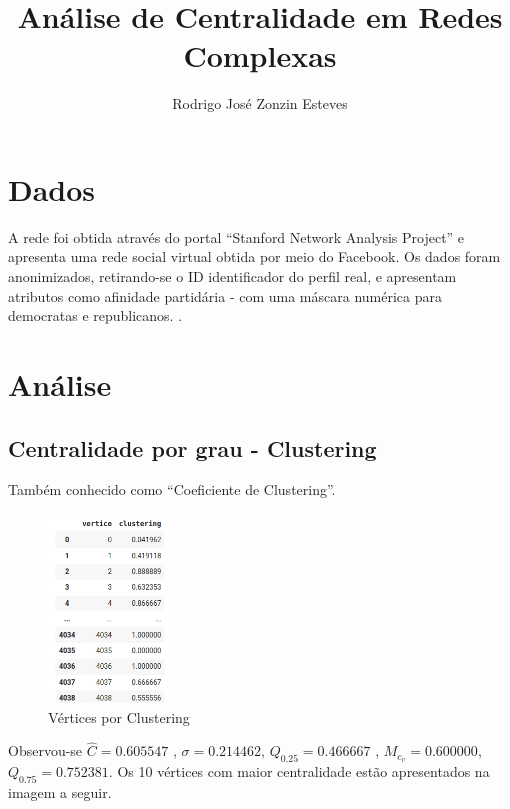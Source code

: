 \documentclass{article}
\title{Análise de Centralidade em Redes Complexas}
\author{Rodrigo José Zonzin Esteves\inst{1}}
\begin{document}
 

\maketitle
     

\section{Dados}
A rede foi obtida através do portal “Stanford Network Analysis Project” e apresenta uma rede social virtual obtida por meio do Facebook. Os dados foram anonimizados, retirando-se o ID identificador do perfil real, e apresentam atributos como afinidade partidária - com uma máscara numérica para democratas e republicanos. \cite{McAuley2012}.  

\section{Análise}
\subsection{Centralidade por grau - Clustering}

Também conhecido como “Coeficiente de Clustering”. 
\begin{figure}[h!]
	\centering
	\caption{Vértices por Clustering}
	
	\includegraphics[height=5cm]{img/clustering}
	
	\label{fig:clustering}
\end{figure}


Observou-se $\hat{C} =   0.605547$ , $ \sigma = 0.214462$, $Q_{0.25}= 0.466667$ , $M_{c_v} = 0.600000$, $Q_{0.75}= 0.752381$. 
Os 10 vértices com maior centralidade estão apresentados na imagem a seguir. 
\end{document}
